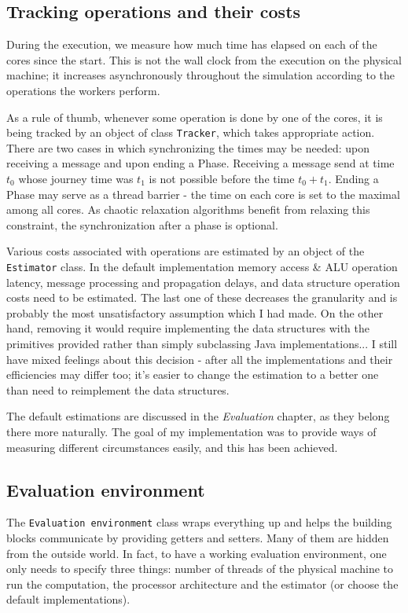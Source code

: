 \documentclass[12pt,a4paper,twoside,openright]{report}
\begin{document}
\subsection{Tracking operations and their costs}
During the execution, we measure how much time has elapsed on each of the cores since the start. This is not the wall clock from the execution on the physical machine; it increases asynchronously throughout the simulation according to the operations the workers perform.

As a rule of thumb, whenever some operation is done by one of the cores, it is being tracked by an object of class \texttt{Tracker}, which takes appropriate action. There are two cases in which synchronizing the times may be needed: upon receiving a message and upon ending a Phase. Receiving a message send at time $t_0$ whose journey time was $t_1$ is not possible before the time $t_0+t_1$. Ending a Phase may serve as a thread barrier - the time on each core is set to the maximal among all cores. As chaotic relaxation algorithms benefit from relaxing this constraint, the synchronization after a phase is optional.

Various costs associated with operations are estimated by an object of the \texttt{Estimator} class. In the default implementation memory access \& ALU operation latency, message processing and propagation delays, and data structure operation costs need to be estimated. The last one of these decreases the granularity and is probably the most unsatisfactory assumption which I had made. On the other hand, removing it would require implementing the data structures with the primitives provided rather than simply subclassing Java implementations... I still have mixed feelings about this decision - after all the implementations and their efficiencies may differ too; it's easier to change the estimation to a better one than need to reimplement the data structures.

The default estimations are discussed in the \textit{Evaluation} chapter, as they belong there more naturally. The goal of my implementation was to provide ways of measuring different circumstances easily, and this has been achieved.

\subsection{Evaluation environment}
The \texttt{Evaluation environment} class wraps everything up and helps the building blocks communicate by providing getters and setters. Many of them are hidden from the outside world. In fact, to have a working evaluation environment, one only needs to specify three things: number of threads of the physical machine to run the computation, the processor architecture and the estimator (or choose the default implementations).
\end{document}
